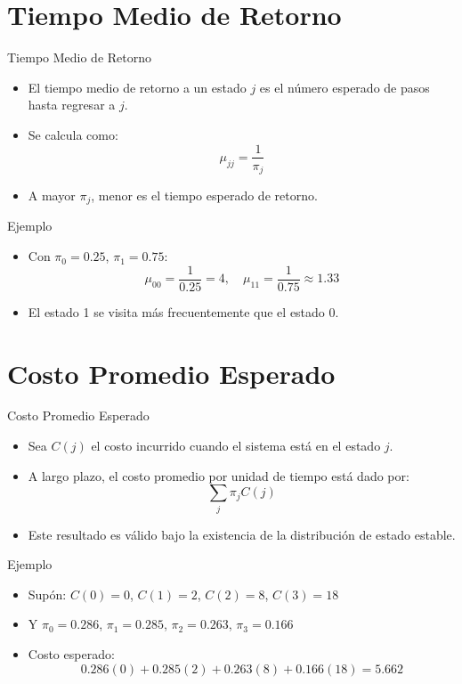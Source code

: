 \documentclass{beamer}
\begin{document}
\section{Tiempo Medio de Retorno}

\begin{frame}{Tiempo Medio de Retorno}
\begin{itemize}
  \item El tiempo medio de retorno a un estado $j$ es el número esperado de pasos hasta regresar a $j$.
  \item Se calcula como:
  \[
  \mu_{jj} = \frac{1}{\pi_j}
  \]
  \item A mayor $\pi_j$, menor es el tiempo esperado de retorno.
\end{itemize}
\end{frame}

\begin{frame}{Ejemplo}
\begin{itemize}
  \item Con $\pi_0 = 0.25$, $\pi_1 = 0.75$:
  \[
  \mu_{00} = \frac{1}{0.25} = 4, \quad \mu_{11} = \frac{1}{0.75} \approx 1.33
  \]
  \item El estado 1 se visita más frecuentemente que el estado 0.
\end{itemize}
\end{frame}

\section{Costo Promedio Esperado}

\begin{frame}{Costo Promedio Esperado}
\begin{itemize}
  \item Sea $C(j)$ el costo incurrido cuando el sistema está en el estado $j$.
  \item A largo plazo, el costo promedio por unidad de tiempo está dado por:
  \[
  \sum_j \pi_j C(j)
  \]
  \item Este resultado es válido bajo la existencia de la distribución de estado estable.
\end{itemize}
\end{frame}

\begin{frame}{Ejemplo}
\begin{itemize}
  \item Supón: $C(0)=0$, $C(1)=2$, $C(2)=8$, $C(3)=18$
  \item Y $\pi_0 = 0.286$, $\pi_1 = 0.285$, $\pi_2 = 0.263$, $\pi_3 = 0.166$
  \item Costo esperado:
  \[
  0.286(0) + 0.285(2) + 0.263(8) + 0.166(18) = 5.662
  \]
\end{itemize}
\end{frame}
\end{document}
